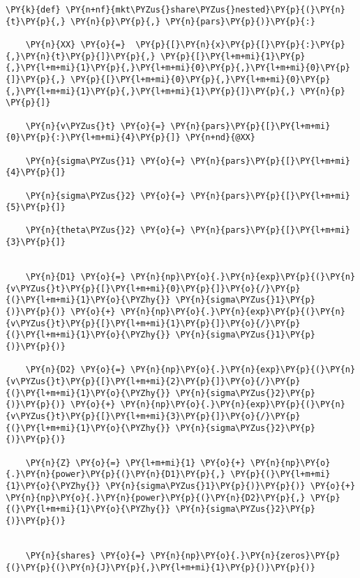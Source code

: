 \begin{tcolorbox}[breakable, size=fbox, boxrule=1pt, pad at break*=1mm,colback=cellbackground, colframe=cellborder]
\begin{Verbatim}[commandchars=\\\{\}]
\PY{k}{def} \PY{n+nf}{mkt\PYZus{}share\PYZus{}nested}\PY{p}{(}\PY{n}{t}\PY{p}{,} \PY{n}{p}\PY{p}{,} \PY{n}{pars}\PY{p}{)}\PY{p}{:}

    \PY{n}{XX} \PY{o}{=}  \PY{p}{[}\PY{n}{x}\PY{p}{[}\PY{p}{:}\PY{p}{,}\PY{n}{t}\PY{p}{]}\PY{p}{,} \PY{p}{[}\PY{l+m+mi}{1}\PY{p}{,}\PY{l+m+mi}{1}\PY{p}{,}\PY{l+m+mi}{0}\PY{p}{,}\PY{l+m+mi}{0}\PY{p}{]}\PY{p}{,} \PY{p}{[}\PY{l+m+mi}{0}\PY{p}{,}\PY{l+m+mi}{0}\PY{p}{,}\PY{l+m+mi}{1}\PY{p}{,}\PY{l+m+mi}{1}\PY{p}{]}\PY{p}{,} \PY{n}{p}  \PY{p}{]}

    \PY{n}{v\PYZus{}t} \PY{o}{=} \PY{n}{pars}\PY{p}{[}\PY{l+m+mi}{0}\PY{p}{:}\PY{l+m+mi}{4}\PY{p}{]} \PY{n+nd}{@XX}

    \PY{n}{sigma\PYZus{}1} \PY{o}{=} \PY{n}{pars}\PY{p}{[}\PY{l+m+mi}{4}\PY{p}{]}

    \PY{n}{sigma\PYZus{}2} \PY{o}{=} \PY{n}{pars}\PY{p}{[}\PY{l+m+mi}{5}\PY{p}{]}

    \PY{n}{theta\PYZus{}2} \PY{o}{=} \PY{n}{pars}\PY{p}{[}\PY{l+m+mi}{3}\PY{p}{]}


    \PY{n}{D1} \PY{o}{=} \PY{n}{np}\PY{o}{.}\PY{n}{exp}\PY{p}{(}\PY{n}{v\PYZus{}t}\PY{p}{[}\PY{l+m+mi}{0}\PY{p}{]}\PY{o}{/}\PY{p}{(}\PY{l+m+mi}{1}\PY{o}{\PYZhy{}} \PY{n}{sigma\PYZus{}1}\PY{p}{)}\PY{p}{)} \PY{o}{+} \PY{n}{np}\PY{o}{.}\PY{n}{exp}\PY{p}{(}\PY{n}{v\PYZus{}t}\PY{p}{[}\PY{l+m+mi}{1}\PY{p}{]}\PY{o}{/}\PY{p}{(}\PY{l+m+mi}{1}\PY{o}{\PYZhy{}} \PY{n}{sigma\PYZus{}1}\PY{p}{)}\PY{p}{)}

    \PY{n}{D2} \PY{o}{=} \PY{n}{np}\PY{o}{.}\PY{n}{exp}\PY{p}{(}\PY{n}{v\PYZus{}t}\PY{p}{[}\PY{l+m+mi}{2}\PY{p}{]}\PY{o}{/}\PY{p}{(}\PY{l+m+mi}{1}\PY{o}{\PYZhy{}} \PY{n}{sigma\PYZus{}2}\PY{p}{)}\PY{p}{)} \PY{o}{+} \PY{n}{np}\PY{o}{.}\PY{n}{exp}\PY{p}{(}\PY{n}{v\PYZus{}t}\PY{p}{[}\PY{l+m+mi}{3}\PY{p}{]}\PY{o}{/}\PY{p}{(}\PY{l+m+mi}{1}\PY{o}{\PYZhy{}} \PY{n}{sigma\PYZus{}2}\PY{p}{)}\PY{p}{)}

    \PY{n}{Z} \PY{o}{=} \PY{l+m+mi}{1} \PY{o}{+} \PY{n}{np}\PY{o}{.}\PY{n}{power}\PY{p}{(}\PY{n}{D1}\PY{p}{,} \PY{p}{(}\PY{l+m+mi}{1}\PY{o}{\PYZhy{}} \PY{n}{sigma\PYZus{}1}\PY{p}{)}\PY{p}{)} \PY{o}{+} \PY{n}{np}\PY{o}{.}\PY{n}{power}\PY{p}{(}\PY{n}{D2}\PY{p}{,} \PY{p}{(}\PY{l+m+mi}{1}\PY{o}{\PYZhy{}} \PY{n}{sigma\PYZus{}2}\PY{p}{)}\PY{p}{)}


    \PY{n}{shares} \PY{o}{=} \PY{n}{np}\PY{o}{.}\PY{n}{zeros}\PY{p}{(}\PY{p}{(}\PY{n}{J}\PY{p}{,}\PY{l+m+mi}{1}\PY{p}{)}\PY{p}{)}


\end{Verbatim}
\end{tcolorbox}
